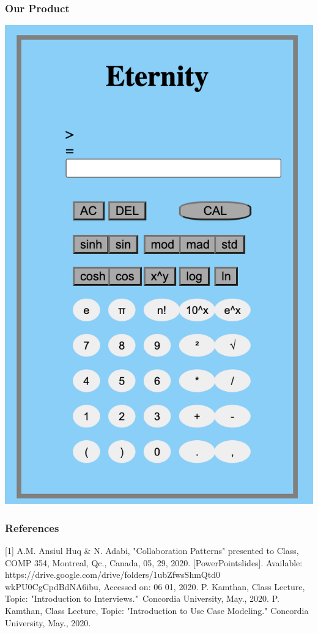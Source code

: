 \documentclass{beamer}
\begin{document}
\begin{frame}
\frametitle{Our Product}
\centering
\includegraphics[scale = 0.4]{Calculator}
\end{frame}

\begin{frame}
\frametitle{References}
[1] A.M. Ansiul Huq \& N. Adabi, "Collaboration Patterns" presented to Class, COMP 354, Montreal, Qc., Canada, 05, 29, 2020. [PowerPointslides]. Available: https://drive.google.com/drive/folders/1ubZfwsSh\textunderscore mQtd0
\newline wkPU0CgCpdBdNA6ibu, Accessed on: 06 01, 2020.
\newline\newline
[2] P. Kamthan, Class Lecture, Topic: "Introduction to Interviews." Concordia University, May., 2020.
\newline\newline
[3] P. Kamthan, Class Lecture, Topic: "Introduction to Use Case Modeling." Concordia University, May., 2020.

\end{frame}
\end{document}
